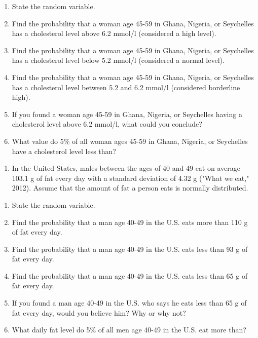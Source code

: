 \documentclass[]{book}
\providecommand{\tightlist}{%
  \setlength{\itemsep}{0pt}\setlength{\parskip}{0pt}}
\begin{document}
\begin{enumerate}
\def\labelenumi{\alph{enumi}.}
\item
  State the random variable.
\item
  Find the probability that a woman age 45-59 in Ghana, Nigeria, or
  Seychelles has a cholesterol level above 6.2 mmol/l (considered a
  high level).
\item
  Find the probability that a woman age 45-59 in Ghana, Nigeria, or
  Seychelles has a cholesterol level below 5.2 mmol/l (considered a
  normal level).
\item
  Find the probability that a woman age 45-59 in Ghana, Nigeria, or
  Seychelles has a cholesterol level between 5.2 and 6.2 mmol/l
  (considered borderline high).
\item
  If you found a woman age 45-59 in Ghana, Nigeria, or Seychelles
  having a cholesterol level above 6.2 mmol/l, what could you
  conclude?
\item
  What value do 5\% of all woman ages 45-59 in Ghana, Nigeria, or
  Seychelles have a cholesterol level less than?
\end{enumerate}

\begin{enumerate}
\def\labelenumi{\arabic{enumi}.}
\setcounter{enumi}{6}
\tightlist
\item
  In the United States, males between the ages of 40 and 49 eat on
  average 103.1 g of fat every day with a standard deviation of 4.32 g
  ("What we eat," 2012). Assume that the amount of fat a person eats
  is normally distributed.
\end{enumerate}

\begin{enumerate}
\def\labelenumi{\alph{enumi}.}
\item
  State the random variable.
\item
  Find the probability that a man age 40-49 in the U.S. eats more than
  110 g of fat every day.
\item
  Find the probability that a man age 40-49 in the U.S. eats less than
  93 g of fat every day.
\item
  Find the probability that a man age 40-49 in the U.S. eats less than
  65 g of fat every day.
\item
  If you found a man age 40-49 in the U.S. who says he eats less than
  65 g of fat every day, would you believe him? Why or why not?
\item
  What daily fat level do 5\% of all men age 40-49 in the U.S. eat more
  than?
\end{enumerate}
\end{document}
